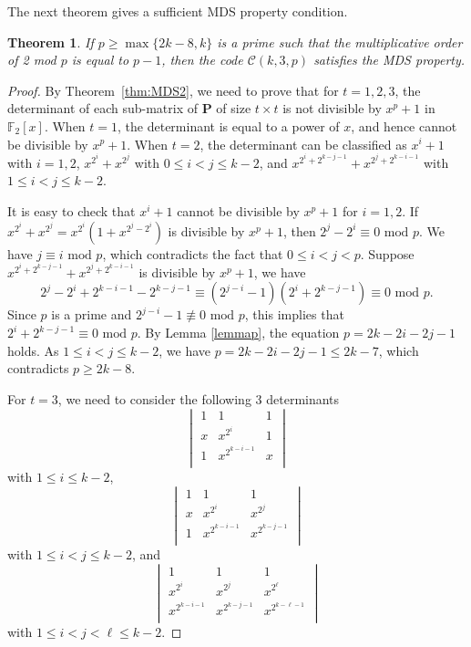 \documentclass[conference]{IEEEtran}
\newtheorem{theorem}{Theorem}
\begin{document}
The next theorem gives a sufficient MDS property condition.
\begin{theorem}
If $p \geq \max\{2k-8,k\}$ is a prime such that the multiplicative order of 2 mod $p$ is equal to $p-1$,  then the code $\mathcal{C}(k,3,p)$ satisfies the MDS property.
\label{thm:MDS5}
\end{theorem}
\begin{proof}
By Theorem~\ref{thm:MDS2}, we need to prove that for $t=1,2,3$, the determinant of each sub-matrix of $\mathbf{P}$ of size $t\times t$ is not divisible by $x^p+1$ in $\mathbb{F}_2[x]$.
When $t=1$, the determinant is equal to a power of $x$, and hence cannot be divisible by $x^p+1$. When $t=2$, the determinant can be classified as $x^i+1$ with $i=1,2$, $x^{2^i}+x^{2^j}$ with $0\leq i< j\leq k-2$, and $x^{2^i+2^{k-j-1}}+x^{2^j+2^{k-i-1}}$ with $1\leq i< j\leq k-2$.

It is easy to check that $x^i+1$ cannot be divisible by $x^p+1$ for $i=1,2$. If $x^{2^i}+x^{2^j}=x^{2^i}(1+x^{2^j-2^i})$ is divisible by $x^p+1$, then $2^j-2^i\equiv 0 \mbox{ mod } p$. We have $j\equiv i \mbox{ mod }p$, which contradicts the fact that $0\leq i< j<p$.
Suppose $x^{2^i+2^{k-j-1}}+x^{2^j+2^{k-i-1}}$ is divisible by $x^p+1$, we have
\[
2^j-2^i+2^{k-i-1}-2^{k-j-1}\equiv (2^{j-i}-1)(2^i+2^{k-j-1}) \equiv 0 \text{ mod }p.
\]
Since $p$ is a prime and $2^{j-i}-1 \not\equiv 0 \mbox{ mod } p$, this implies that $2^i+2^{k-j-1} \equiv 0 \mbox{ mod }p$.
By Lemma \ref{lemmap}, the equation $p=2k-2i-2j-1$ holds. As $1\leq i< j\leq k-2$, we have $p=2k-2i-2j-1\leq 2k-7$, which contradicts $p \geq 2k-8$.

For $t= 3$, we need to consider the following 3 determinants
\begin{equation}
\begin{vmatrix}
1 & 1 & 1 \\
x & x^{2^i} & 1 \\
1 & x^{2^{k-i-1}} & x \\
\end{vmatrix}
\label{deter1}
\end{equation}
with $1\leq i\leq k-2$,
\begin{equation}
\begin{vmatrix}
1 & 1 & 1 \\
x & x^{2^i} & x^{2^j} \\
1 & x^{2^{k-i-1}} & x^{2^{k-j-1}} \\
\end{vmatrix}
\label{deter2}
\end{equation}
with $1\leq i<j\leq k-2$, and
\begin{equation}
\begin{vmatrix}
1 & 1 & 1 \\
x^{2^i} & x^{2^j} & x^{2^{\ell}} \\
x^{2^{k-i-1}} & x^{2^{k-j-1}} & x^{2^{k-\ell-1}} \\
\end{vmatrix}
\label{deter3}
\end{equation}
with $1\leq i<j<\ell\leq k-2$.


\end{proof}
\end{document}
